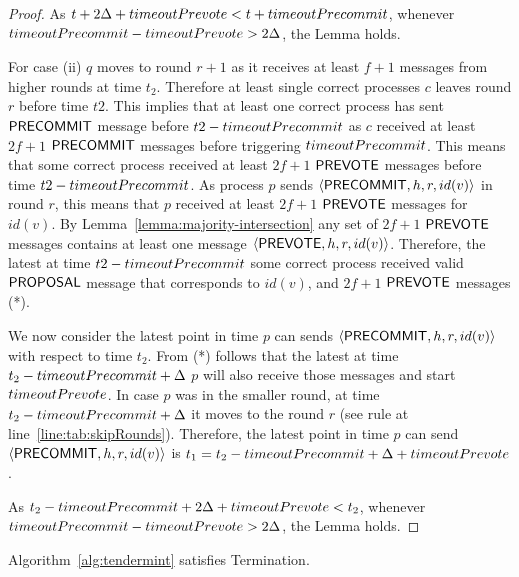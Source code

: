 \begin{proof}
As $t + 2\Delta + timeoutPrevote < t+ timeoutPrecommit$,
whenever $timeoutPrecommit - timeoutPrevote > 2\Delta$, the Lemma holds.

For case (ii) $q$ moves to round $r+1$ as it receives at least $f+1$ messages from higher rounds at time $t_2$. 
Therefore at least single correct processes $c$ leaves round $r$ before time $t2$. This implies that at least one correct process has sent $\mathsf{PRECOMMIT}$ message before $t2-timeoutPrecommit$ as $c$ received at least $2f+1$ $\mathsf{PRECOMMIT}$ messages before triggering $timeoutPrecommit$. This means that some correct process received at least $2f+1$ $\mathsf{PREVOTE}$ messages before time $t2-timeoutPrecommit$. As process $p$ sends $\langle\mathsf{PRECOMMIT},h,r,id(v)\rangle$ in round $r$, this means that $p$ received at least $2f+1$ $\mathsf{PREVOTE}$ messages for $id(v)$. By Lemma~\ref{lemma:majority-intersection} any set of $2f+1$ $\mathsf{PREVOTE}$ messages contains at least one message $\langle\mathsf{PREVOTE},h,r,id(v)\rangle$.
Therefore, the latest at time $t2-timeoutPrecommit$ some correct process received valid $\mathsf{PROPOSAL}$ message that corresponds to $id(v)$, and $2f+1$ $\mathsf{PREVOTE}$ messages (*).   

We now consider the latest point in time $p$ can sends $\langle\mathsf{PRECOMMIT},h,r,id(v)\rangle$ with respect to time $t_2$. From (*) follows that the 
latest at time $t_2 -timeoutPrecommit +\Delta$ $p$ will also receive those messages and start $timeoutPrevote$. In case $p$ was in the smaller round, at time $t_2 -timeoutPrecommit + \Delta$ it moves to the round $r$ (see rule at line~\ref{line:tab:skipRounds}). Therefore, the latest point in time $p$ can send $\langle\mathsf{PRECOMMIT},h,r,id(v)\rangle$ is $t_1 = t_2 -timeoutPrecommit +\Delta + timeoutPrevote$.

As $t_2 -timeoutPrecommit +2\Delta + timeoutPrevote < t_2$, whenever $timeoutPrecommit - timeoutPrevote > 2\Delta$, the Lemma holds.    
\end{proof}

\begin{lemma}
	\label{lemma:agreement}
Algorithm~\ref{alg:tendermint} satisfies Termination. 
\end{lemma}

